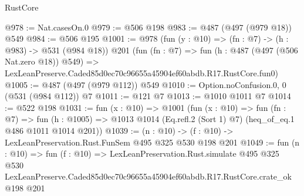 \begin{lexlean}{RustCore}
\begin{coremodule}
@978 := Nat.casesOn.{0}
@979 := @506 @198
@983 := @487 (@497 (@979 @18)) @549
@984 := @506 @195
@1001 := @978
    (fun (y : @10) => (fn : @7) -> (h : @983) -> @531 (@984 @18))
    @201
    (fun (fn : @7) =>
    fun (h : @487 (@497 (@506 Nat.zero @18)) @549) =>
    LexLeanPreserve.Caded85d0ec70c96655a45904ef60abdb.R17.RustCore.fun0)
@1005 := @487 (@497 (@979 @112)) @549
@1010 := Option.noConfusion.{0, 0} (@531 (@984 @112)) @7
@1011 := @121 @7
@1013 := @1010 @1011 @7
@1014 := @522 @198
@1031 := fun (x : @10) =>
  @1001
    (fun (x : @10) =>
    fun (fn : @7) =>
    fun (h : @1005) => @1013 @1014 (Eq.refl.{2} (Sort 1) @7) (heq_of_eq.{1} @486 @1011 @1014 @201))
@1039 := (n : @10) -> (f : @10) -> LexLeanPreservation.Rust.FunSem @495 @325 @530 @198 @201
@1049 := fun (n : @10) =>
  fun (f : @10) =>
  LexLeanPreservation.Rust.simulate
    @495
    @325
    @530
    LexLeanPreserve.Caded85d0ec70c96655a45904ef60abdb.R17.RustCore.crate_ok
    @198
    @201
\end{coremodule}
\end{lexlean}
